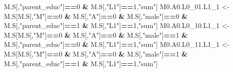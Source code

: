 \documentclass[
]{book}
\newenvironment{Shaded}{\begin{snugshade}}{\end{snugshade}}
\newcommand{\DecValTok}[1]{\textcolor[rgb]{0.00,0.00,0.81}{#1}}
\newcommand{\NormalTok}[1]{#1}
\newcommand{\OtherTok}[1]{\textcolor[rgb]{0.56,0.35,0.01}{#1}}
\newcommand{\SpecialCharTok}[1]{\textcolor[rgb]{0.81,0.36,0.00}{\textbf{#1}}}
\newcommand{\StringTok}[1]{\textcolor[rgb]{0.31,0.60,0.02}{#1}}
\begin{document}
\begin{Shaded}
\begin{Highlighting}[]
\NormalTok{                            M.S[,}\StringTok{"parent\_educ"}\NormalTok{]}\SpecialCharTok{==}\DecValTok{0} \SpecialCharTok{\&}\NormalTok{ M.S[,}\StringTok{"L1"}\NormalTok{]}\SpecialCharTok{==}\DecValTok{1}\NormalTok{,}\StringTok{"sum"}\NormalTok{]}
\NormalTok{  M0.A0.L0\_01.L1\_1 }\OtherTok{\textless{}{-}}\NormalTok{ M.S[M.S[,}\StringTok{"M"}\NormalTok{]}\SpecialCharTok{==}\DecValTok{0} \SpecialCharTok{\&}\NormalTok{ M.S[,}\StringTok{"A"}\NormalTok{]}\SpecialCharTok{==}\DecValTok{0} \SpecialCharTok{\&}\NormalTok{ M.S[,}\StringTok{"male"}\NormalTok{]}\SpecialCharTok{==}\DecValTok{0} \SpecialCharTok{\&} 
\NormalTok{                            M.S[,}\StringTok{"parent\_educ"}\NormalTok{]}\SpecialCharTok{==}\DecValTok{1} \SpecialCharTok{\&}\NormalTok{ M.S[,}\StringTok{"L1"}\NormalTok{]}\SpecialCharTok{==}\DecValTok{1}\NormalTok{,}\StringTok{"sum"}\NormalTok{]}
\NormalTok{  M0.A0.L0\_10.L1\_1 }\OtherTok{\textless{}{-}}\NormalTok{ M.S[M.S[,}\StringTok{"M"}\NormalTok{]}\SpecialCharTok{==}\DecValTok{0} \SpecialCharTok{\&}\NormalTok{ M.S[,}\StringTok{"A"}\NormalTok{]}\SpecialCharTok{==}\DecValTok{0} \SpecialCharTok{\&}\NormalTok{ M.S[,}\StringTok{"male"}\NormalTok{]}\SpecialCharTok{==}\DecValTok{1} \SpecialCharTok{\&} 
\NormalTok{                            M.S[,}\StringTok{"parent\_educ"}\NormalTok{]}\SpecialCharTok{==}\DecValTok{0} \SpecialCharTok{\&}\NormalTok{ M.S[,}\StringTok{"L1"}\NormalTok{]}\SpecialCharTok{==}\DecValTok{1}\NormalTok{,}\StringTok{"sum"}\NormalTok{]}
\NormalTok{  M0.A0.L0\_11.L1\_1 }\OtherTok{\textless{}{-}}\NormalTok{ M.S[M.S[,}\StringTok{"M"}\NormalTok{]}\SpecialCharTok{==}\DecValTok{0} \SpecialCharTok{\&}\NormalTok{ M.S[,}\StringTok{"A"}\NormalTok{]}\SpecialCharTok{==}\DecValTok{0} \SpecialCharTok{\&}\NormalTok{ M.S[,}\StringTok{"male"}\NormalTok{]}\SpecialCharTok{==}\DecValTok{1} \SpecialCharTok{\&} 
\NormalTok{                            M.S[,}\StringTok{"parent\_educ"}\NormalTok{]}\SpecialCharTok{==}\DecValTok{1} \SpecialCharTok{\&}\NormalTok{ M.S[,}\StringTok{"L1"}\NormalTok{]}\SpecialCharTok{==}\DecValTok{1}\NormalTok{,}\StringTok{"sum"}\NormalTok{]}
  

\end{Highlighting}
\end{Shaded}
\end{document}
